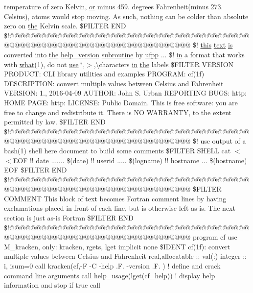 \begin{DoxyCompactItemize}
temperature of zero Kelvin, \hyperlink{what__overview_81_8txt_a93f5d39a36ed511cc0dc88a20a517388}{or} minus 459. degrees Fahrenheit(minus 273. Celsius), atoms would stop moving. As such, nothing can be colder than absolute zero on \hyperlink{M__stopwatch_83_8txt_a0f266597de2e57eb3aa964927bb30e14}{the} Kelvin scale. \$F\+I\+L\+T\+ER E\+ND \$!@@@@@@@@@@@@@@@@@@@@@@@@@@@@@@@@@@@@@@@@@@@@@@@@@@@@@@@@@@@@@@@@@@@@@@@@@@@@@@@@ \$! \hyperlink{M__stopwatch_83_8txt_ad62a52042bb610eee5b36b5516caec22}{this} \hyperlink{README_8txt_afda9e6898bd09238e9e9be4c62ce246b}{text} \hyperlink{intro__blas1_83_8txt_a42a91df93f840595de3019ceb5d1df23}{is} converted into \hyperlink{M__stopwatch_83_8txt_a0f266597de2e57eb3aa964927bb30e14}{the} \hyperlink{xauth__key_8f90_ad2aaabc58e93e13e8a0d5acf843eb5d0}{help\+\_\+version} \hyperlink{M__stopwatch_83_8txt_acfbcff50169d691ff02d4a123ed70482}{subroutine} by \hyperlink{ufpp_8f90_ae38e75311f766ddb27e1389ad1e8f7cc}{ufpp} ... \$! \hyperlink{M__journal_83_8txt_afce72651d1eed785a2132bee863b2f38}{in} a format that works with \hyperlink{what__overview_81_8txt_a8cdf8efd1b900d6dce77a3f97edb2216}{what}(1), do not \hyperlink{intro__blas1_83_8txt_a04fa2694d85f67a675bb3f45f7241f48}{use} \char`\"{},$>$,\textbackslash{}characters \hyperlink{M__journal_83_8txt_afce72651d1eed785a2132bee863b2f38}{in} \hyperlink{M__stopwatch_83_8txt_a0f266597de2e57eb3aa964927bb30e14}{the} labels \$F\+I\+L\+T\+ER V\+E\+R\+S\+I\+ON P\+R\+O\+D\+U\+C\+T\+: C\+LI library utilities and examples P\+R\+O\+G\+R\+A\+M\+: cf(1f) D\+E\+S\+C\+R\+I\+P\+T\+I\+O\+N\+: convert multiple values between Celsius and Fahrenheit V\+E\+R\+S\+I\+O\+N\+: 1., 2016-\/04-\/09 A\+U\+T\+H\+O\+R\+: John S. Urban R\+E\+P\+O\+R\+T\+I\+N\+G B\+U\+G\+S\+: http\+: H\+O\+M\+E P\+A\+G\+E\+: http\+: L\+I\+C\+E\+N\+S\+E\+: Public Domain. This is free software\+: you are free to change and redistribute it. There is N\+O W\+A\+R\+R\+A\+N\+T\+Y, to the extent permitted by law. \$\+F\+I\+L\+T\+E\+R E\+N\+D \$!@@@@@@@@@@@@@@@@@@@@@@@@@@@@@@@@@@@@@@@@@@@@@@@@@@@@@@@@@@@@@@@@@@@@@@@@@@@@@@@@ \$! use output of a bash(1) shell here document to build some comments \$\+F\+I\+L\+T\+E\+R S\+H\+E\+L\+L cat $<$$<$\+E\+O\+F !! date ....... \$(date) !! userid ..... \$(logname) !! hostname ... \$(hostname) E\+O\+F \$\+F\+I\+L\+T\+E\+R E\+N\+D \$!@@@@@@@@@@@@@@@@@@@@@@@@@@@@@@@@@@@@@@@@@@@@@@@@@@@@@@@@@@@@@@@@@@@@@@@@@@@@@@@@ \$\+F\+I\+L\+T\+E\+R C\+O\+M\+M\+E\+N\+T This block of text becomes Fortran comment lines by having exclamations placed in front of each line, but is otherwise left as-\/is. The next section is just as-\/is Fortran \$\+F\+I\+L\+T\+E\+R E\+N\+D \$!@@@@@@@@@@@@@@@@@@@@@@@@@@@@@@@@@@@@@@@@@@@@@@@@@@@@@@@@@@@@@@@@@@@@@@@@@@@@@@@@ program cf use M\+\_\+kracken, only\+: kracken, rgets, lget implicit none \$\+I\+D\+E\+N\+T cf(1f)\+: convert multiple values between Celsius and Fahrenheit real,allocatable \+:: val(\+:) integer \+:: i, isum=0 call kracken(\textquotesingle{}cf\textquotesingle{},\textquotesingle{}-\/\+F -\/\+C -\/help .\+F. -\/version .\+F.\textquotesingle{} ) ! define and crack command line arguments call help\+\_\+usage(lget(\textquotesingle{}cf\+\_\+help\textquotesingle{})) ! display help information and stop if true call 
\end{DoxyCompactItemize}
